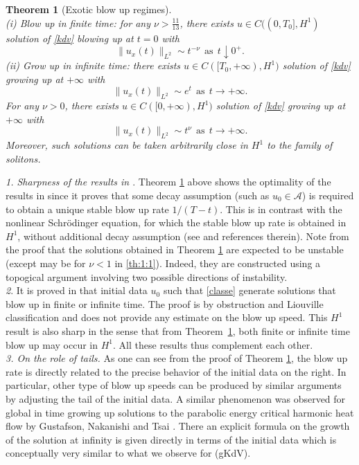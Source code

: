 \documentclass[11pt,a4paper,reqno]{amsart}
\newtheorem{theorem}{Theorem}[section]
\theoremstyle{remark}
\numberwithin{equation}{section}
\newcommand{\be}{\begin{equation}}
\newcommand{\ee}{\end{equation}}
\begin{document}
\begin{theorem}[Exotic blow up regimes]\label{th:1}\ \\
{\rm (i)  Blow up in finite time:} for any $\nu > \frac {11}{13}$,  there exists $u \in  C((0,T_0],H^1)$   solution  of \eqref{kdv} blowing up at $t=0$ with
\be\label{th:1:1}
\|u_x(t)\|_{L^2} \sim t^{-\nu}\ \ \mbox{as}\ \ t\downarrow 0^+.\ee
{\rm (ii)  Grow up in infinite time:} there exists  $u\in  C([T_0,+\infty),H^1)$ solution of \eqref{kdv} growing  up at $ +\infty$ with
\be\label{th:1:4}
\|u_x(t)\|_{L^2} \sim e^{t} \ \ \mbox{as}\ \ t\to +\infty.
\ee
For any $\nu>0$,  
there exists  $u\in  C([0,+\infty),H^1)$ solution of \eqref{kdv} growing  up at $ +\infty$ with
\be\label{th:1:5}
\|u_x(t)\|_{L^2} \sim t^{\nu}\ \ \mbox{as}\ \ t\to +\infty.
\ee
Moreover, such solutions can be taken arbitrarily close in $H^1$ to the family of solitons.
\end{theorem}

\smallskip

{\it 1. Sharpness of the results in \cite{MMR1, MMR2}}. Theorem \ref{th:1} above shows the optimality of the results in  \cite{MMR1, MMR2} since it proves that some decay assumption (such as $u_0\in \mathcal A$) is required to obtain a unique  stable blow up rate $1/(T-t)$. This is in contrast with the nonlinear Schr\"odinger equation, for which the stable blow up rate is obtained in $H^1$, without additional decay assumption (see \cite{MRjams} and references therein). Note from the proof that the solutions obtained in Theorem \ref{th:1} are expected to be unstable (except may be for $\nu<1$ in \eqref{th:1:1}). Indeed, they are constructed using a topogical argument involving two possible directions of instability.\\

{\it 2}.
It is proved in \cite{Mjams, MMannals} that initial data $u_0$ such that \eqref{classe} generate solutions that blow up in finite or infinite time. The proof is by obstruction and Liouville classification and does not provide any estimate on the blow up speed. This $H^1$ result is also sharp in the sense that  from Theorem~\ref{th:1},  both finite or infinite time blow up may occur in $H^1$.  All these results  thus complement each other.\\
 

{\it 3. On the role of tails.} As one can see from the proof of Theorem \ref{th:1}, the blow up rate is directly related to the precise behavior of the initial data on the right. In particular, other type of blow up speeds can be produced by similar arguments by adjusting the tail of the initial data. A   similar phenomenon was observed for global in time growing up solutions to the parabolic energy critical harmonic heat flow by Gustafson, Nakanishi and Tsai \cite{NT2}. There an explicit formula on the growth of the solution at infinity is given directly in terms of the initial data which is conceptually very similar to what we observe for (gKdV). 
\end{document}
